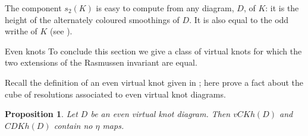 \documentclass[10pt,oneside]{amsart}
\newtheorem{proposition}[theorem]{Proposition}
\theoremstyle{definition}
\numberwithin{equation}{section}
\begin{document}
The component \( s_2 ( K ) \) is easy to compute from any diagram, \( D \), of \( K \): it is the height of the alternately coloured smoothings of \( D \). It is also equal to the odd writhe of \( K \) (see \cite[Proposition \( 4.11 \)]{Rushworth2017}).

{		{\normalfont\bfseries\large}}{Even knots}\label{Subsec:evenknots}
To conclude this section we give a class of virtual knots for which the two extensions of the Rasmussen invariant are equal.

Recall the definition of an even virtual knot given in ; here prove a fact about the cube of resolutions associated to even virtual knot diagrams.

\begin{proposition}
	\label{Prop:noeta}
	Let \( D \) be an even virtual knot diagram. Then \( vCKh ( D ) \) and \( CDKh ( D ) \) contain no \( \eta \) maps.
\end{proposition}
\end{document}
